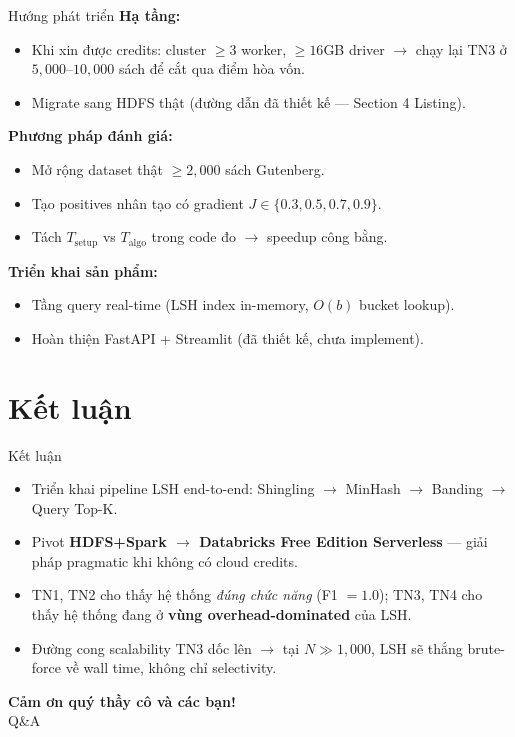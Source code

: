 \documentclass[10pt,aspectratio=169]{beamer}
\begin{document}
\begin{frame}{Hướng phát triển}
  \textbf{Hạ tầng:}
  \begin{itemize}
    \item Khi xin được credits: cluster $\geq 3$ worker, $\geq 16$GB driver $\rightarrow$ chạy lại TN3 ở $5{,}000$--$10{,}000$ sách để cắt qua điểm hòa vốn.
    \item Migrate sang HDFS thật (đường dẫn đã thiết kế --- Section 4 Listing).
  \end{itemize}

  \vfill
  \textbf{Phương pháp đánh giá:}
  \begin{itemize}
    \item Mở rộng dataset thật $\geq 2{,}000$ sách Gutenberg.
    \item Tạo positives nhân tạo có gradient $J \in \{0.3, 0.5, 0.7, 0.9\}$.
    \item Tách $T_{\text{setup}}$ vs $T_{\text{algo}}$ trong code đo $\rightarrow$ speedup công bằng.
  \end{itemize}

  \vfill
  \textbf{Triển khai sản phẩm:}
  \begin{itemize}
    \item Tầng query real-time (LSH index in-memory, $O(b)$ bucket lookup).
    \item Hoàn thiện FastAPI + Streamlit (đã thiết kế, chưa implement).
  \end{itemize}
\end{frame}

\section{Kết luận}

\begin{frame}{Kết luận}
  \begin{itemize}
    \item Triển khai pipeline LSH end-to-end: Shingling $\rightarrow$ MinHash $\rightarrow$ Banding $\rightarrow$ Query Top-K.
    \item Pivot \textbf{HDFS+Spark $\rightarrow$ Databricks Free Edition Serverless} --- giải pháp pragmatic khi không có cloud credits.
    \item TN1, TN2 cho thấy hệ thống \emph{đúng chức năng} (F1 $= 1.0$); TN3, TN4 cho thấy hệ thống đang ở \textbf{vùng overhead-dominated} của LSH.
    \item Đường cong scalability TN3 dốc lên $\rightarrow$ tại $N \gg 1{,}000$, LSH sẽ thắng brute-force về wall time, không chỉ selectivity.
  \end{itemize}

  \vfill
  \begin{center}
  {\Large\textbf{Cảm ơn quý thầy cô và các bạn!}}\\[0.6em]
  {\large Q\&A}
  \end{center}
\end{frame}
\end{document}
